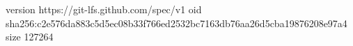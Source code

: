 version https://git-lfs.github.com/spec/v1
oid sha256:c2e576da883c5d5ec08b33f766ed2532bc7163db76aa26d5cba19876208e97a4
size 127264

